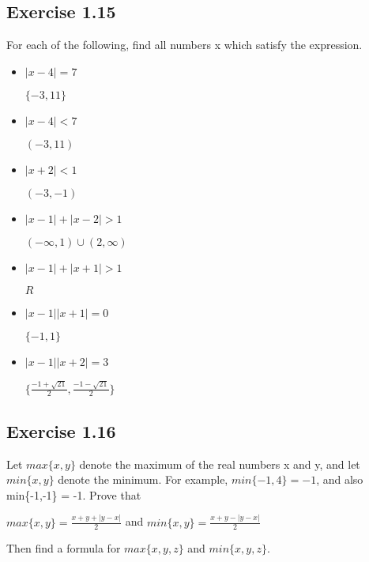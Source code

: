 \documentclass[12pt]{article}
\begin{document}
		\subsection*{Exercise 1.15}
			For each of the following, find all numbers x which satisfy the expression.
			\begin{itemize}
				\item $|x-4| = 7$
					
					$\{-3,11\}$
				\item $|x-4| < 7$
				
					$(-3, 11)$
				\item $|x+2| < 1$
					
					$(-3,-1)$
				\item $|x-1|+|x-2| > 1$
				
					$(-\infty, 1) \cup (2, \infty)$
				\item $|x-1|+|x+1| > 1$
				
					$R$
				\item $|x-1||x+1| = 0$
				
					$\{-1, 1\}$
				\item $|x-1||x+2| = 3$
				
					$\{\frac{-1+\sqrt{21}}{2}, \frac{-1-\sqrt{21}}{2} \}$
			\end{itemize}
		\subsection*{Exercise 1.16}
			Let $max\{x,y\}$ denote the maximum of the real numbers x and y, and let $min\{x,y\}$ denote the minimum. For example, $min\{-1,4\} = -1$, and also min\{-1,-1\} = -1. Prove that
			
				$max\{x,y\} = \frac{x+y+|y-x|}{2}$ and $min\{x,y\} = \frac{x+y-|y-x|}{2}$
				
			Then find a formula for $max\{x,y,z\}$ and $min\{x,y,z\}$.
			
\end{document}
